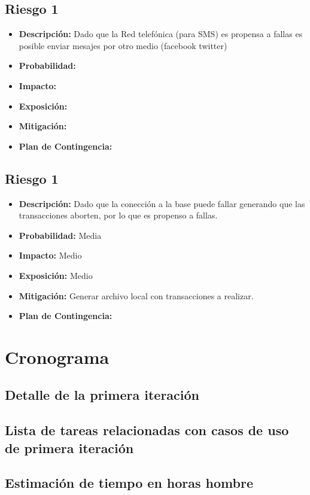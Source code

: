 \documentclass[a4paper, 11pt]{article}
\begin{document}
\subsection{Riesgo 1}
\begin{itemize}

\item \textbf{Descripci\'on:} Dado que la Red telefónica (para SMS) es propensa a fallas es posible enviar mesajes por otro medio (facebook twitter)
\item \textbf{Probabilidad:}
\item \textbf{Impacto:}
\item \textbf{Exposici\'on:}
\item \textbf{Mitigaci\'on:}
\item \textbf{Plan de Contingencia:}
\end{itemize}

\subsection{Riesgo 1}
\begin{itemize}

\item \textbf{Descripci\'on:} Dado que la conección a la base puede fallar generando que las transacciones aborten, por lo que es propenso a fallas.
\item \textbf{Probabilidad:} Media
\item \textbf{Impacto:} Medio
\item \textbf{Exposici\'on:} Medio
\item \textbf{Mitigaci\'on:} Generar archivo local con transacciones a realizar.
\item \textbf{Plan de Contingencia:} 
\end{itemize}

\newpage

\section{Cronograma}


\subsection{Detalle de la primera iteraci\'on}

\subsection{Lista de tareas relacionadas con casos de uso de primera iteraci\'on}

\subsection{Estimaci\'on de tiempo en horas hombre}

\end{document}
